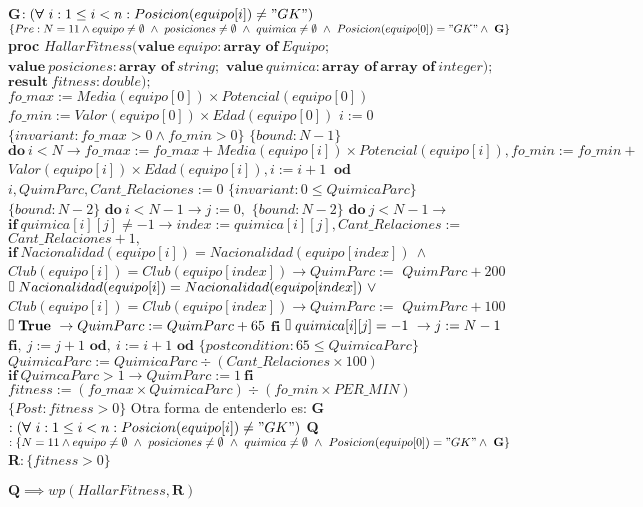 \documentclass{article}
\begin{document}
\State \textbf{G}{$: (\boldsymbol{\forall} \ i : 1 \leq i < n : Posicion(equipo[i]) \neq "GK" )$}
\State $\{Pre: N = 11 \land equipo \neq \emptyset \ \land \ posiciones \neq \emptyset \ \land \ quimica \neq \emptyset \ \land \ Posicion(equipo[0]) = "GK" \land \ \textbf{G} \}$ 
\State \textbf{proc }{$HallarFitness(\textbf{value} \ equipo : \textbf{array \ of}\ Equipo;$}
\State {} $\textbf{value} \ posiciones : \textbf{array \ of} \ string; $
\State {} $\textbf{value} \ quimica : \textbf{array \ of}\ \textbf{array \ of} \ integer);$
\State {} $\textbf{result} \ fitness : double);$
\State {} $fo\_max := Media(equipo[0]) \times Potencial(equipo[0])$
\State {} $fo\_min := Valor(equipo[0]) \times Edad(equipo[0])$
\State {} $i := 0$
\State {} $\{invariant: fo\_max > 0 \land fo\_min > 0\}$
\State {} $\{bound: N-1\}$
\State {} $\textbf{do}\ i < N \rightarrow fo\_max := fo\_max + Media(equipo[i]) \times Potencial(equipo[i]), fo\_min := fo\_min +$
\State {} $Valor(equipo[i]) \times Edad(equipo[i]), i := i + 1 \  $
\State {} $\textbf{od}$
\State {} $i, QuimParc, Cant\_Relaciones := 0$
\State {} $\{invariant: 0 \leq QuimicaParc\}$
\State {} $\{bound: N-2\}$
\State {} $\textbf{do}\ i < N-1 \rightarrow j := 0, $
\State {} $\{bound: N-2\}$
\State {} $\textbf{do}\ j < N-1 \rightarrow$
\State {} $\textbf{if}\ quimica[i][j] \neq -1 \rightarrow index := quimica[i][j], Cant\_Relaciones := $
\State {} $Cant\_Relaciones + 1, $
\State {} $\textbf{if}\ Nacionalidad(equipo[i]) = Nacionalidad(equipo[index]) \ \land $
\State {} $Club(equipo[i]) = Club(equipo[index])\rightarrow QuimParc := $
\State {} $QuimParc +200$
\State {} $\tikz \draw (0,0) rectangle (0.1,0.25); \ Nacionalidad(equipo[i]) = Nacionalidad(equipo[index]) \ \lor $
\State {} $Club(equipo[i]) = Club(equipo[index])\rightarrow QuimParc := $
\State {} $QuimParc +100$
\State {} $\tikz \draw (0,0) rectangle (0.1,0.25); \ \textbf{True} \ \rightarrow QuimParc := QuimParc +65$
\State {} $\textbf{fi}$
\State {} $\tikz \draw (0,0) rectangle (0.1,0.25); \ quimica[i][j] = -1 \ \rightarrow j := N-1$
\State {} $\textbf{fi}, \ j := j + 1$
\State {} $\textbf{od}, \ i := i + 1$
\State {} $\textbf{od}$
\State {} $\{postcondition: 65 \leq QuimicaParc\}$
\State {} $QuimicaParc := QuimicaParc \div (Cant\_Relaciones \times 100)$
\State {} $\textbf{if} \ QuimcaParc > 1 \rightarrow QuimParc := 1 \ \textbf{fi}$
\State {} $fitness := (fo\_max \times QuimicaParc) \div (fo\_min \times PER\_MIN)$
\State $\{Post: fitness > 0\}$
\State
\State Otra forma de entenderlo es:
\State \textbf{G}{$: (\boldsymbol{\forall} \ i : 1 \leq i < n : Posicion(equipo[i]) \neq "GK" )$}
\State \textbf{Q}{$: \{N = 11 \land equipo \neq \emptyset \ \land \ posiciones \neq \emptyset \ \land \ quimica \neq \emptyset \ \land \ Posicion(equipo[0]) = "GK" \land \ \textbf{G} \}$}
\State \textbf{R}{$: \{fitness > 0\}$}

\State $\textbf{Q} \implies wp(HallarFitness, \textbf{R})$
\end{document}
